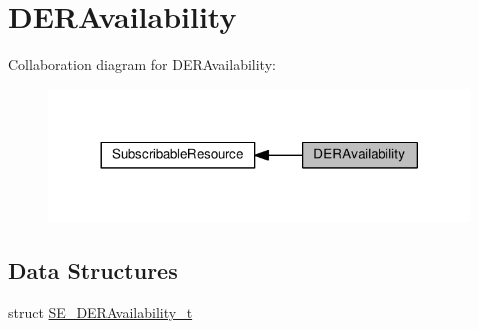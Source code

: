 \hypertarget{group__DERAvailability}{}\section{D\+E\+R\+Availability}
\label{group__DERAvailability}
Collaboration diagram for D\+E\+R\+Availability\+:\nopagebreak
\begin{figure}[H]
\begin{center}
\leavevmode
\includegraphics[width=317pt]{group__DERAvailability}
\end{center}
\end{figure}
\subsection*{Data Structures}
\begin{DoxyCompactItemize}
\item 
struct \hyperlink{structSE__DERAvailability__t}{S\+E\+\_\+\+D\+E\+R\+Availability\+\_\+t}
\end{DoxyCompactItemize}
